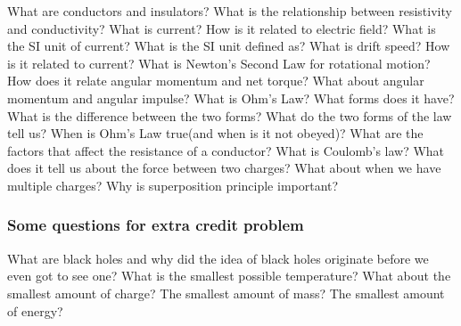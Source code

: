 \documentclass[13pt,addpoints]{exam}
\begin{document}
\begin{questions}
		\question What are conductors and insulators? What is the relationship between resistivity and conductivity?
		\question What is current? How is it related to electric field? What is the SI unit of current? What is the SI unit defined as? What is drift speed? How is it related to current?
		\question What is Newton's Second Law for rotational motion? How does it relate angular momentum and net torque? What about angular momentum and angular impulse?
		\question What is Ohm's Law? What forms does it have? What is the difference between the two forms? What do the two forms of the law tell us? When is Ohm's Law true(and when is it not obeyed)? What are the factors that affect the resistance of a conductor?
		\question What is Coulomb's law? What does it tell us about the force between two charges? What about when we have multiple charges? Why is superposition principle important?
		\subsubsection*{Some questions for extra credit problem}
		\question What are black holes and why did the idea of black holes originate before we even got to see one? 
		\question What is the smallest possible temperature? What about the smallest amount of charge? The smallest amount of mass? The smallest amount of energy?
	\end{questions}
\end{document}
